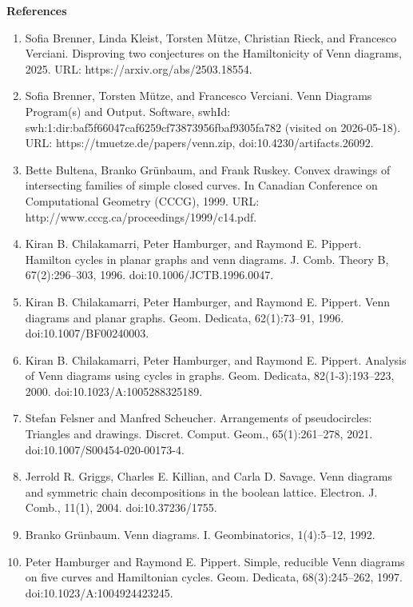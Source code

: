 \documentclass[10pt,a4paper]{article}
\begin{document}
\par
\par
\par\medskip\noindent\textbf{References}\par
\begin{enumerate}
\item[]  [1]  Sofia Brenner, Linda Kleist, Torsten Mütze, Christian Rieck, and Francesco Verciani.  Disproving two conjectures on the Hamiltonicity of Venn diagrams, 2025.  URL: https://arxiv.org/abs/2503.18554.  
\item[]  [2]  Sofia Brenner, Torsten Mütze, and Francesco Verciani.  Venn Diagrams Program(s) and Output.  Software, swhId: swh:1:dir:baf5f66047caf6259cf73873956fbaf9305fa782 (visited on 2026-05-18).  URL: https://tmuetze.de/papers/venn.zip, doi:10.4230/artifacts.26092.  
\item[]  [3]  Bette Bultena, Branko Grünbaum, and Frank Ruskey.  Convex drawings of intersecting families of simple closed curves.  In Canadian Conference on Computational Geometry (CCCG), 1999.  URL: http://www.cccg.ca/proceedings/1999/c14.pdf.  
\item[]  [4]  Kiran B. Chilakamarri, Peter Hamburger, and Raymond E. Pippert.  Hamilton cycles in planar graphs and venn diagrams.  J. Comb. Theory B, 67(2):296–303, 1996.  doi:10.1006/JCTB.1996.0047.  
\item[]  [5]  Kiran B. Chilakamarri, Peter Hamburger, and Raymond E. Pippert.  Venn diagrams and planar graphs.  Geom. Dedicata, 62(1):73–91, 1996.  doi:10.1007/BF00240003.  
\item[]  [6]  Kiran B. Chilakamarri, Peter Hamburger, and Raymond E. Pippert.  Analysis of Venn diagrams using cycles in graphs.  Geom. Dedicata, 82(1-3):193–223, 2000.  doi:10.1023/A:1005288325189.  
\item[]  [7]  Stefan Felsner and Manfred Scheucher.  Arrangements of pseudocircles: Triangles and drawings.  Discret. Comput. Geom., 65(1):261–278, 2021.  doi:10.1007/S00454-020-00173-4.  
\item[]  [8]  Jerrold R. Griggs, Charles E. Killian, and Carla D. Savage.  Venn diagrams and symmetric chain decompositions in the boolean lattice.  Electron. J. Comb., 11(1), 2004.  doi:10.37236/1755.  
\item[]  [9]  Branko Grünbaum.  Venn diagrams. I.  Geombinatorics, 1(4):5–12, 1992.  
\item[]  [10]  Peter Hamburger and Raymond E. Pippert.  Simple, reducible Venn diagrams on five curves and Hamiltonian cycles.  Geom. Dedicata, 68(3):245–262, 1997.  doi:10.1023/A:1004924423245.  

\end{enumerate}
\end{document}
